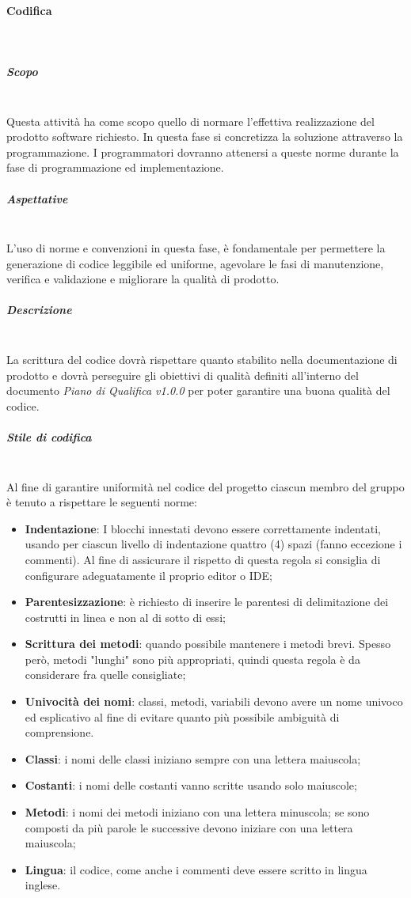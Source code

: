 		\paragraph{Codifica} \mbox{}\\
			\subparagraph{Scopo} \mbox{}\\
			Questa attività ha come scopo quello di normare l'effettiva realizzazione del prodotto software richiesto. In questa fase si concretizza la soluzione attraverso la programmazione. I programmatori dovranno attenersi a queste norme durante la fase di programmazione ed implementazione.
			\subparagraph{Aspettative} \mbox{}\\
			L'uso di norme e convenzioni in questa fase, è fondamentale per permettere la generazione di codice leggibile ed uniforme,  agevolare le fasi di manutenzione,  verifica e validazione e migliorare la qualità di prodotto.
			\subparagraph{Descrizione} \mbox{}\\
			La scrittura del codice dovrà rispettare quanto stabilito nella documentazione di prodotto e dovrà perseguire gli obiettivi di qualità definiti all’interno del documento \textit{Piano di Qualifica v1.0.0} per poter garantire una buona qualità del codice.
			\subparagraph{Stile di codifica} \mbox{}\\
			Al fine di garantire uniformità nel codice del progetto ciascun membro del gruppo è
			tenuto a rispettare le seguenti norme:
			\begin{itemize}
				\item \textbf{Indentazione}: I blocchi innestati devono essere correttamente indentati, usando per ciascun livello di indentazione quattro (4) spazi (fanno eccezione i commenti). Al fine di assicurare il rispetto di questa regola si consiglia di configurare adeguatamente il proprio editor o IDE;
				\item \textbf{Parentesizzazione}: è richiesto di inserire le parentesi di delimitazione dei costrutti in linea e non al di sotto di essi;
				\item \textbf{Scrittura dei metodi}: quando possibile mantenere i metodi brevi. Spesso però, metodi "lunghi" sono più appropriati, quindi questa regola è da considerare fra quelle consigliate;
				\item \textbf{Univocità dei nomi}: classi, metodi, variabili devono avere un nome univoco	ed esplicativo al fine di evitare quanto più possibile ambiguità di comprensione.
				\item \textbf{Classi}: i nomi delle classi iniziano sempre con una lettera maiuscola;
				\item \textbf{Costanti}: i nomi delle costanti vanno scritte usando solo maiuscole;
				\item \textbf{Metodi}: i nomi dei metodi iniziano con una lettera minuscola;
				se sono composti da più parole le successive devono iniziare con una lettera
				maiuscola;
				\item \textbf{Lingua}: il codice, come anche i commenti deve essere scritto in lingua inglese.
			\end{itemize}
